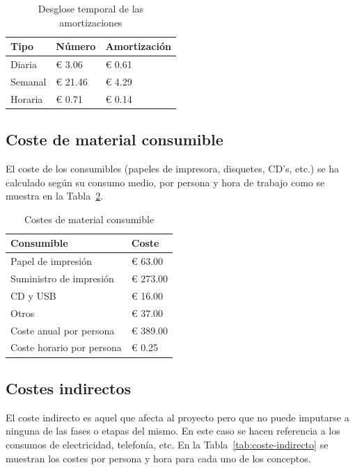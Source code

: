 \begin{table}[H]
    \centering
    \begin{tabular}{lll}
        \toprule
        Tipo    & Número  & Amortización \\
        \midrule
        Diaria  & € 3.06  & € 0.61       \\
        Semanal & € 21.46 & € 4.29       \\
        Horaria & € 0.71  & € 0.14       \\
        \bottomrule
    \end{tabular}
    \caption{Desglose temporal de las amortizaciones }
    \label{tab:coste-amortizacion}
\end{table}

\subsection{Coste de material consumible}

El coste de los consumibles (papeles de impresora, disquetes, CD's, etc.) se ha calculado según su consumo medio, por persona y hora de trabajo como se muestra en la Tabla~\ref{tab:coste-consumibles}.

\begin{table}[H]
    \centering
    \begin{tabular}{ll}
        \toprule
        Consumible                & Coste    \\
        \midrule
        Papel de impresión        & € 63.00  \\
        Suministro de impresión   & € 273.00 \\
        CD y USB                  & € 16.00  \\
        Otros                     & € 37.00  \\
        \midrule
        Coste anual por persona   & € 389.00 \\
        Coste horario por persona & € 0.25   \\
        \bottomrule
    \end{tabular}
    \caption{Costes de material consumible}
    \label{tab:coste-consumibles}
\end{table}

\subsection{Costes indirectos}

El coste indirecto es aquel que afecta al proyecto pero que no puede imputarse a ninguna de las fases o etapas del mismo.
En este caso se hacen referencia a los consumos de electricidad, telefonía, etc.
En la Tabla~\ref{tab:coste-indirecto} se muestran los costes por persona y hora para cada uno de los conceptos.


